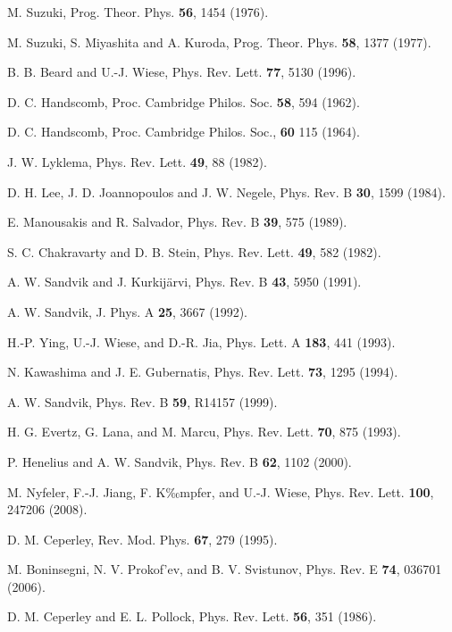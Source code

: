 \documentclass[draft,numberedheadings]{aipproc}
\begin{document}
\begin{thebibliography}{999}
M. Suzuki, Prog. Theor. Phys. {\bf 56}, 1454 (1976).

M. Suzuki, S. Miyashita and A. Kuroda, Prog. Theor. Phys. {\bf 58}, 1377 (1977). 

B. B. Beard and U.-J. Wiese, Phys. Rev. Lett. {\bf 77}, 5130 (1996).

D. C. Handscomb, Proc. Cambridge Philos. Soc. {\bf 58}, 594 (1962).

D. C. Handscomb, Proc. Cambridge Philos. Soc., {\bf 60} 115 (1964).

J. W. Lyklema, Phys. Rev. Lett. {\bf 49}, 88 (1982). 

D. H. Lee, J. D. Joannopoulos and J. W. Negele, Phys. Rev. B {\bf 30}, 1599 (1984).

E. Manousakis and R. Salvador, Phys. Rev. B {\bf 39}, 575 (1989).

S. C. Chakravarty and D. B. Stein, Phys. Rev. Lett. {\bf 49}, 582 (1982). 

A. W. Sandvik and J. Kurkij\"arvi, Phys. Rev. B {\bf 43}, 5950 (1991).

A. W. Sandvik, J. Phys. A {\bf 25}, 3667 (1992).

H.-P. Ying, U.-J. Wiese, and D.-R. Jia, Phys. Lett. A {\bf  183}, 441 (1993).

N. Kawashima and J. E. Gubernatis, Phys. Rev. Lett. {\bf 73}, 1295 (1994).

A. W. Sandvik, Phys. Rev. B {\bf 59}, R14157 (1999).

H. G. Evertz, G. Lana, and M. Marcu, Phys. Rev. Lett. {\bf 70}, 875 (1993).

P. Henelius and A. W. Sandvik, Phys. Rev. B {\bf 62}, 1102 (2000).

M. Nyfeler, F.-J. Jiang, F. K‰mpfer, and U.-J. Wiese, Phys. Rev. Lett. {\bf 100}, 247206 (2008).

D. M. Ceperley, Rev. Mod. Phys. {\bf 67}, 279 (1995).

M. Boninsegni, N. V. Prokof'ev, and B. V. Svistunov,
Phys. Rev. E {\bf 74}, 036701 (2006).

D. M. Ceperley and E. L. Pollock, Phys. Rev. Lett. {\bf 56}, 351 (1986).


\end{thebibliography}
\end{document}
